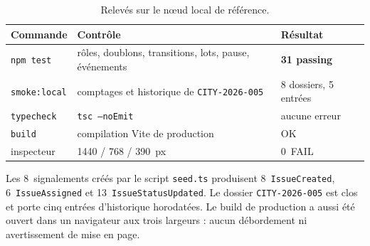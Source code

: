 \documentclass[11pt,a4paper,parskip=half,DIV=12,headinclude,footinclude]{scrartcl}
\begin{document}
\begin{table}[htbp]
\centering
\caption{Relevés sur le nœud local de référence.}
\begin{tabularx}{\textwidth}{@{}lXl@{}}
\toprule
\rowcolor{brandsoft}\color{ink}
\textbf{Commande} & \textbf{Contrôle} & \textbf{Résultat} \\
\midrule
\texttt{npm test} & rôles, doublons, transitions, lots, pause, événements & \textbf{31 passing} \\
\texttt{smoke:local} & comptages et historique de \texttt{CITY-2026-005} & 8 dossiers, 5 entrées \\
\texttt{typecheck} & \texttt{tsc --noEmit} & aucune erreur \\
\texttt{build} & compilation Vite de production & OK \\
inspecteur & 1440 / 768 / 390~px & 0~FAIL \\
\bottomrule
\end{tabularx}
\end{table}

Les 8~signalements créés par le script \texttt{seed.ts} produisent
8~\texttt{IssueCreated}, 6~\texttt{IssueAssigned} et
13~\texttt{IssueStatusUpdated}. Le dossier \texttt{CITY-2026-005} est clos et
porte cinq entrées d'historique horodatées. Le build de production a aussi été
ouvert dans un navigateur aux trois largeurs : aucun débordement ni avertissement
de mise en page.
\end{document}
